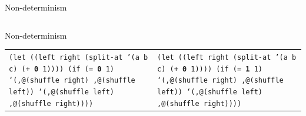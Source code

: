 \documentclass{beamer}
\begin{document}
\begin{frame}{Non-determinism}
\begin{tabularx}{\textwidth}{ X X }
  \end{tabularx}
\end{frame}


\begin{frame}{Non-determinism}
  \tiny
  \begin{tabularx}{\textwidth}{ X X }
    \texttt{(let ((left right (split-at '(a b c)\newline
      \hphantom{\_\_\_\_\_\_\_\_\_\_\_\_\_\_\_\_\_\_\_}
      (+ \textbf{0} 1))))\newline
      \hphantom{\_\_}(if (= \textbf{0} 1)\newline
      \hphantom{\_\_\_\_\_\_}`(,@(shuffle right)\newline
      \hphantom{ \_\_\_\_\_\_\_},@(shuffle left))\newline
      \hphantom{ \_\_\_\_}`(,@(shuffle left)\newline
      \hphantom{ \_\_\_\_\_\_},@(shuffle right))))\newline
      \ 
    }
    &
    \texttt{(let ((left right (split-at '(a b c)\newline
      \hphantom{\_\_\_\_\_\_\_\_\_\_\_\_\_\_\_\_\_\_\_}
      (+ \textbf{0} 1))))\newline
      \hphantom{\_\_}(if (= \textbf{1} 1)\newline
      \hphantom{\_\_\_\_\_\_}`(,@(shuffle right)\newline
      \hphantom{ \_\_\_\_\_\_\_},@(shuffle left))\newline
      \hphantom{ \_\_\_\_}`(,@(shuffle left)\newline
      \hphantom{ \_\_\_\_\_\_},@(shuffle right))))\newline
      \ 
    }

    \\
    

\end{tabularx}
\end{frame}
\end{document}
